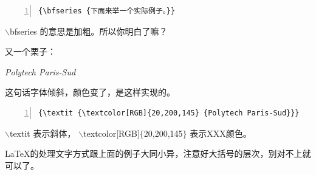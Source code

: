 \documentclass[12pt,a4paper,oneside]{book}
\begin{document}
{\cons 
\begin{lstlisting}[numbers=left, numberstyle=\tiny, keywordstyle=\color{blue!70},  frame=shadowbox, rulesepcolor=\color{red!20!green!20!blue!20}]
{\bfseries {下面来举一个实际例子。}}
\end{lstlisting}
\par
$\backslash$bfseries 的意思是加粗。所以你明白了嘛？
\par
又一个栗子：
\par
{\textit {\textcolor[RGB]{20,200,145} {Polytech Paris-Sud}}}
\par
这句话字体倾斜，颜色变了，是这样实现的。
\par

\begin{lstlisting}[language={[ANSI]C}, numbers=left, numberstyle=\tiny, keywordstyle=\color{blue!70},  frame=shadowbox, rulesepcolor=\color{red!20!green!20!blue!20}]
{\textit {\textcolor[RGB]{20,200,145} {Polytech Paris-Sud}}}
\end{lstlisting}
\par
$\backslash$textit 表示斜体， $\backslash$textcolor[RGB]$\{$20,200,145$\}$ 表示XXX颜色。

\par
\LaTeX 的处理文字方式跟上面的例子大同小异，注意好大括号的层次，别对不上就可以了。
\vspace{2em}
}
\end{document}
